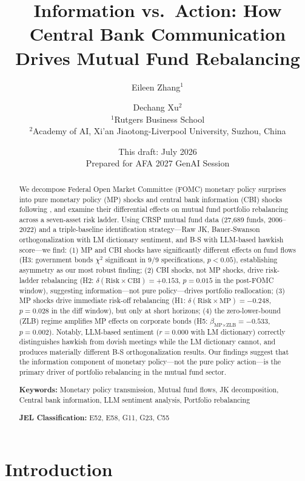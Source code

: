 \documentclass[11pt,a4paper]{article}
\title{\textbf{Information vs.\ Action: How Central Bank Communication Drives Mutual Fund Rebalancing}}
\author{
Eileen Zhang$^{1}$ \and Dechang Xu$^{2}$ \\
\small $^1$Rutgers Business School \\
\small $^2$Academy of AI, Xi'an Jiaotong-Liverpool University, Suzhou, China
}
\date{This draft: July 2026 \\ \small Prepared for AFA 2027 GenAI Session}
\begin{document}
\maketitle

\begin{abstract}
\noindent We decompose Federal Open Market Committee (FOMC) monetary policy surprises into pure monetary policy (MP) shocks and central bank information (CBI) shocks following \citet{jarocinski2020deconstructing}, and examine their differential effects on mutual fund portfolio rebalancing across a seven-asset risk ladder. Using CRSP mutual fund data (27,689 funds, 2006--2022) and a triple-baseline identification strategy---Raw JK, Bauer-Swanson orthogonalization with LM dictionary sentiment, and B-S with LLM-based hawkish score---we find: (1) MP and CBI shocks have significantly different effects on fund flows (H3: government bonds $\chi^2$ significant in 9/9 specifications, $p < 0.05$), establishing asymmetry as our most robust finding; (2) CBI shocks, not MP shocks, drive risk-ladder rebalancing (H2: $\delta(\text{Risk}\times\text{CBI}) = +0.153$, $p = 0.015$ in the post-FOMC window), suggesting information---not pure policy---drives portfolio reallocation; (3) MP shocks drive immediate risk-off rebalancing (H1: $\delta(\text{Risk}\times\text{MP}) = -0.248$, $p = 0.028$ in the diff window), but only at short horizons; (4) the zero-lower-bound (ZLB) regime amplifies MP effects on corporate bonds (H5: $\beta_{\text{MP}\times\text{ZLB}} = -0.533$, $p = 0.002$). Notably, LLM-based sentiment ($r = 0.000$ with LM dictionary) correctly distinguishes hawkish from dovish meetings while the LM dictionary cannot, and produces materially different B-S orthogonalization results. Our findings suggest that the information component of monetary policy---not the pure policy action---is the primary driver of portfolio rebalancing in the mutual fund sector.

\medskip
\noindent \textbf{Keywords:} Monetary policy transmission, Mutual fund flows, JK decomposition, Central bank information, LLM sentiment analysis, Portfolio rebalancing

\medskip
\noindent \textbf{JEL Classification:} E52, E58, G11, G23, C55
\end{abstract}

\newpage
\tableofcontents
\newpage

\section{Introduction}
\end{document}
